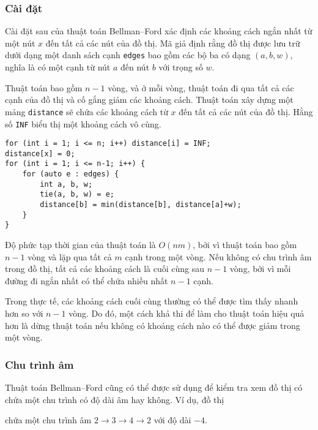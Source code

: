 \subsubsection{Cài đặt}

Cài đặt sau của
thuật toán Bellman–Ford xác định các khoảng cách ngắn nhất
từ một nút $x$ đến tất cả các nút của đồ thị.
Mã giả định rằng đồ thị được lưu trữ
dưới dạng một danh sách cạnh \texttt{edges}
bao gồm các bộ ba có dạng $(a,b,w)$,
nghĩa là có một cạnh từ nút $a$ đến nút $b$
với trọng số $w$.

Thuật toán bao gồm $n-1$ vòng,
và ở mỗi vòng, thuật toán đi qua
tất cả các cạnh của đồ thị và cố gắng
giảm các khoảng cách.
Thuật toán xây dựng một mảng \texttt{distance}
sẽ chứa các khoảng cách từ $x$
đến tất cả các nút của đồ thị.
Hằng số \texttt{INF} biểu thị một khoảng cách vô cùng.

\begin{lstlisting}
for (int i = 1; i <= n; i++) distance[i] = INF;
distance[x] = 0;
for (int i = 1; i <= n-1; i++) {
    for (auto e : edges) {
        int a, b, w;
        tie(a, b, w) = e;
        distance[b] = min(distance[b], distance[a]+w);
    }
}
\end{lstlisting}

Độ phức tạp thời gian của thuật toán là $O(nm)$,
bởi vì thuật toán bao gồm $n-1$ vòng và
lặp qua tất cả $m$ cạnh trong một vòng.
Nếu không có chu trình âm trong đồ thị,
tất cả các khoảng cách là cuối cùng sau $n-1$ vòng,
bởi vì mỗi đường đi ngắn nhất có thể chứa nhiều nhất $n-1$ cạnh.

Trong thực tế, các khoảng cách cuối cùng thường có thể
được tìm thấy nhanh hơn so với $n-1$ vòng.
Do đó, một cách khả thi để làm cho thuật toán hiệu quả hơn
là dừng thuật toán nếu không có khoảng cách nào
có thể được giảm trong một vòng.

\subsubsection{Chu trình âm}


Thuật toán Bellman–Ford cũng có thể được sử dụng để
kiểm tra xem đồ thị có chứa một chu trình có độ dài âm hay không.
Ví dụ, đồ thị

\begin{center}
\end{center}
\noindent
chứa một chu trình âm
$2 \rightarrow 3 \rightarrow 4 \rightarrow 2$
với độ dài $-4$.

